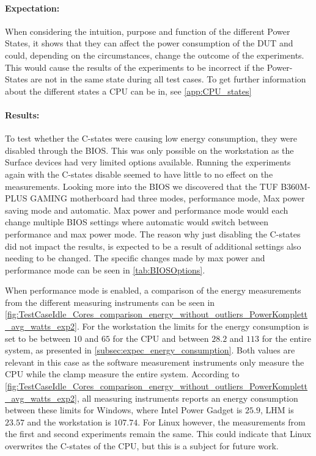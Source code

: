 \paragraph*{Expectation:} When considering the intuition, purpose and function of the different Power States, it shows that they can affect the power consumption of the DUT and could, depending on the circumstances, change the outcome of the experiments. This would cause the results of the experiments to be incorrect if the Power-States are not in the same state during all test cases. To get further information about the different states a CPU can be in, see \cref{app:CPU_states}

\paragraph*{Results:} To test whether the C-states were causing low energy consumption, they were disabled through the  BIOS. This was only possible on the workstation as the Surface devices had very limited options available. Running the experiments again with the C-states disable seemed to have little to no effect on the measurements. Looking more into the BIOS we discovered that the TUF B360M-PLUS GAMING motherboard had three modes, performance mode, Max power saving mode and automatic. Max power and performance mode would each change multiple BIOS settings where automatic would switch between performance and max power mode. The reason why just disabling the C-states did not impact the results, is expected to be a result of additional settings also needing to be changed. The specific changes made by max power and performance mode can be seen in \cref{tab:BIOSOptions}.



When performance mode is enabled, a comparison of the energy measurements from the different measuring instruments can be seen in \cref{fig:TestCaseIdle_Cores_comparison_energy_without_outliers_PowerKomplett_avg_watts_exp2}. For the workstation the limits for the energy consumption is set to be between $10$ and $65$ for the CPU and between $28.2$ and $113$ for the entire system, as presented in \cref{subsec:expec_energy_consumption}. Both values are relevant in this case as the software measurement instruments only measure the CPU while the clamp measure the entire system. According to \cref{fig:TestCaseIdle_Cores_comparison_energy_without_outliers_PowerKomplett_avg_watts_exp2}, all measuring instruments reports an energy consumption between these limits for Windows, where Intel Power Gadget is $25.9$, LHM is $23.57$ and the workstation is $107.74$. For Linux however, the measurements from the first and second experiments remain the same. This could indicate that Linux overwrites the C-states of the CPU, but this is a subject for future work.

